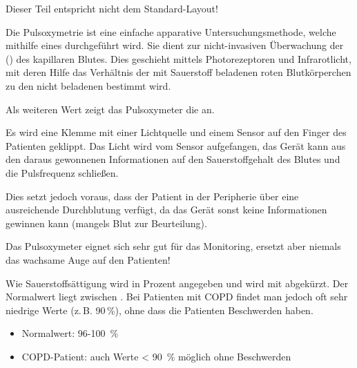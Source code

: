 {Dieser Teil entspricht nicht dem Standard-Layout!}
\MarriedNG{\TxBeschreibung}
{%
Die Pulsoxymetrie ist eine einfache apparative
Untersuchungsmethode, welche mithilfe eines
 durchgeführt wird. 
Sie dient zur nicht-invasiven Überwachung der
 () des kapillaren
Blutes. Dies geschieht mittels Photorezeptoren und
Infrarotlicht, mit deren Hilfe das Verhältnis der mit
Sauerstoff beladenen roten Blutkörperchen zu den nicht
beladenen bestimmt wird. 

Als weiteren Wert zeigt das Pulsoxymeter die
 an.
\cite{LoefflerBiochemie7,ArbeitstechnikenAZ1,Soehnke200607}

}{
{\SymbolText}
}

{%
Es wird eine Klemme mit einer Lichtquelle
und einem Sensor auf den Finger des Patienten
geklippt. Das Licht wird vom
 Sensor aufgefangen, das Gerät kann aus den daraus gewonnenen Informationen auf den Sauerstoffgehalt des Blutes und die Pulsfrequenz schließen. 

Dies setzt jedoch
voraus, dass der Patient in der Peripherie über eine
ausreichende Durchblutung verfügt, da das Gerät sonst keine
Informationen gewinnen kann (mangels Blut zur
Beurteilung). 
}{}{}{}{}



Das Pulsoxymeter eignet sich sehr gut für das Monitoring,
ersetzt aber niemals das wachsame Auge auf den Patienten!

{%
Wie Sauerstoffsättigung wird in Prozent
angegeben und wird mit  abgekürzt. Der Normalwert
liegt zwischen . Bei Patienten mit COPD
findet man jedoch oft sehr niedrige Werte (z.\,B.
90\,\%), ohne dass die Patienten Beschwerden haben. }{
\begin{itemize}
  \item Normalwert: 96-100\, \%
  \item COPD-Patient: auch Werte < 90\, \% möglich ohne
  Beschwerden
\end{itemize}
}{}{}{}


